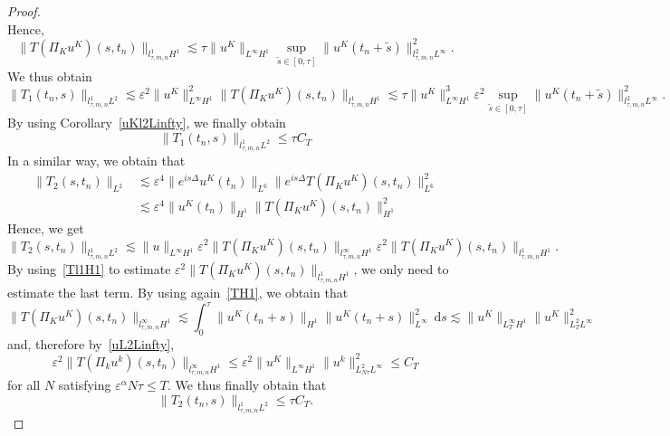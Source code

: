 \documentclass[10pt,a4paper]{article}
\begin{document}
\begin{proof}
\begin{equation}
    \end{equation}
    Hence, 
    \begin{equation}\label{Tl1H1}
      \|T(\Pi_K u^K)(s,t_n)\|_{l^1_{\tau,m,n} H^1} \lesssim \tau \|u^K\|_{L^\infty H^1}
      \sup_{\tilde{s} \in [0,\tau]} \|u^K(t_n+\tilde{s})\|^2_{l^2_{\tau,m,n}L^\infty}.
    \end{equation}
    We thus obtain
    \[ \|T_1(t_n,s)\|_{l^1_{\tau,m,n}L^2} \lesssim \varepsilon^2\|u^K\|_{L^\infty H^1}^2 \|T(\Pi_K u^K)(s,t_n)\|_{l^1_{\tau,m,n} H^1}
    \lesssim \tau \|u^K\|_{L^\infty H^1}^3 \varepsilon^2\sup_{\tilde{s} \in [0,\tau]} 
    \|u^K(t_n+\tilde{s})\|^2_{l^2_{\tau,m,n}L^\infty} .\]
    By using Corollary~\ref{uKl2Linfty}, we finally obtain 
    \begin{equation}\label{T1l1L2}
      \|T_1(t_n,s)\|_{l^1_{\tau,m,n}L^2} \leq \tau C_T
    \end{equation}
    In a similar way, we obtain that 
    \begin{align*}
      \|T_2(s,t_n)\|_{L^2} & \lesssim  \varepsilon^4 \|e^{is\Delta} u^K(t_n)\|_{L^6}
      \| e^{is\Delta}T(\Pi_K u^K)(s,t_n) \|_{L^6}^2 \\
      &\lesssim \varepsilon^4 \|u^K(t_n)\|_{H^1} \|T(\Pi_K u^K)(s, t_n) \|_{H^1}^2
    \end{align*}
    Hence, we get 
    \[ \|T_2(s,t_n)\|_{l^1_{\tau,m,n}L^2} \lesssim \|u\|_{L^\infty H^1} \varepsilon^2 
    \|T(\Pi_K u^K)(s,t_n)\|_{l^\infty_{\tau,m,n}H^1} \varepsilon^2 
    \|T(\Pi_K u^K)(s,t_n)\|_{l^1_{\tau,m,n}H^1}.\]
    By using~\eqref{Tl1H1} to estimate \(\varepsilon^2\|T(\Pi_K u^K)(s,t_n)\|_{l^1_{\tau,m,n} H^1}\), we
    only need to estimate the last term. By using again~\eqref{TH1}, we obtain that
    \[ \|T(\Pi_K u^K)(s,t_n)\|_{l^\infty_{\tau,m,n}H^1} \lesssim \int_0^\tau \|u^K(t_{n}+s)\|_{H^1} \|u^K(t_n+ s) \|_{L^\infty}^2\,\mathrm{d}s \lesssim \|u^K\|_{L^\infty_{T}H^1} \|u^K\|_{L^2_{T}L^\infty}^2 \]
    and, therefore by~\eqref{uL2Linfty},
    \begin{equation}\label{TlinftyH1}
      \varepsilon^2\|T(\Pi_k u^k)(s,t_n)\|_{l^\infty_{\tau,m,n}H^1} \leq 
      \varepsilon^2 \|u^K\|_{L^\infty H^1} \|u^k\|_{L^2_{N\tau} L^\infty}^2 
      \leq C_T
    \end{equation}
    for all \(N\) satisfying \( \varepsilon^\alpha N\tau \leq T \).
    We thus finally obtain that 
    \begin{equation}\label{T2l1L2}
      \|T_2(t_n,s)\|_{l^1_{\tau,m,n}L^2} \leq \tau C_T.
    \end{equation}

\end{proof}
\end{document}
